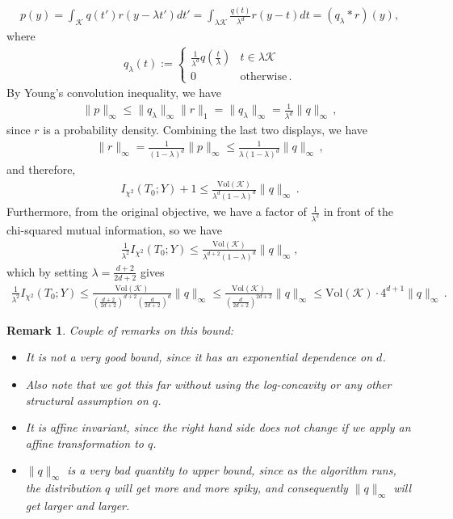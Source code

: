 \documentclass{article}
\theoremstyle{plain}
\theoremstyle{definition}
\theoremstyle{plain}
\newtheorem{remark}[theorem]{Remark}
\newcommand{\cK}{\mathcal K}
\begin{document}
\begin{align}
    p(y)
    = \int_{\cK} q(t') r(y - \lambda t') dt'
    = \int_{\lambda \cK} \frac{q(t)}{\lambda^d} r(y - t) dt
    = (q_\lambda * r)(y),
\end{align}
where
\begin{align}
    q_\lambda(t) :=\begin{cases}
                       \frac{1}{\lambda^d} q\left(\frac{t}{\lambda}\right) & t \in \lambda \cK   \\
                       0                                                   & \text{otherwise}\,.
                   \end{cases}
\end{align}
By Young's convolution inequality, we have
\begin{align}
    \|p\|_{\infty} \le \|q_\lambda\|_{\infty} \|r\|_{1} = \|q_\lambda\|_{\infty} = \frac{1}{\lambda^d} \|q\|_{\infty}\,,
\end{align}
since \(r\) is a probability density.
Combining the last two displays, we have
\begin{align}
    \|r\|_{\infty} = \frac{1}{(1-\lambda)^d} \|p\|_{\infty} \le \frac{1}{\lambda (1-\lambda)^d} \|q\|_{\infty}\,,
\end{align}
and therefore,
\begin{align}
    I_{\chi^2}(T_0; Y) + 1
    \le \frac{\mathrm{Vol}(\cK)}{\lambda^d (1-\lambda)^d} \|q\|_{\infty}\,.
\end{align}
Furthermore, from the original objective, we have a factor of $\frac{1}{\lambda^2}$ in front of the chi-squared mutual information, so we have
\begin{align}
    \frac{1}{\lambda^2} I_{\chi^2}(T_0; Y)
    \le \frac{\mathrm{Vol}(\cK)}{\lambda^{d+2} (1-\lambda)^d} \|q\|_{\infty},
\end{align}
which by setting $\lambda = \frac{d + 2}{2d + 2}$ gives
\begin{align}
    \frac{1}{\lambda^2} I_{\chi^2}(T_0; Y)
    \le \frac{\mathrm{Vol}(\cK)}{\left(\frac{d + 2}{2d + 2}\right)^{d+2} \left(\frac{d}{2d + 2}\right)^d} \|q\|_{\infty}
    \le \frac{\mathrm{Vol}(\cK)}{\left(\frac{d}{2d + 2}\right)^{2d+2}} \|q\|_{\infty}
    \le \mathrm{Vol}(\cK) \cdot 4^{d+1} \|q\|_{\infty}\,.
\end{align}
\begin{remark}
    Couple of remarks on this bound:
    \begin{itemize}
        \item It is not a very good bound, since it has an exponential dependence on $d$.
        \item Also note that we got this far without using the log-concavity or any other structural assumption on $q$.
        \item It is affine invariant, since the right hand side does not change if we apply an affine transformation to $q$.
        \item $\|q\|_{\infty}$ is a very bad quantity to upper bound, since as the algorithm runs, the distribution $q$ will get more and more spiky, and consequently $\|q\|_{\infty}$ will get larger and larger.
    \end{itemize}
\end{remark}
\end{document}
